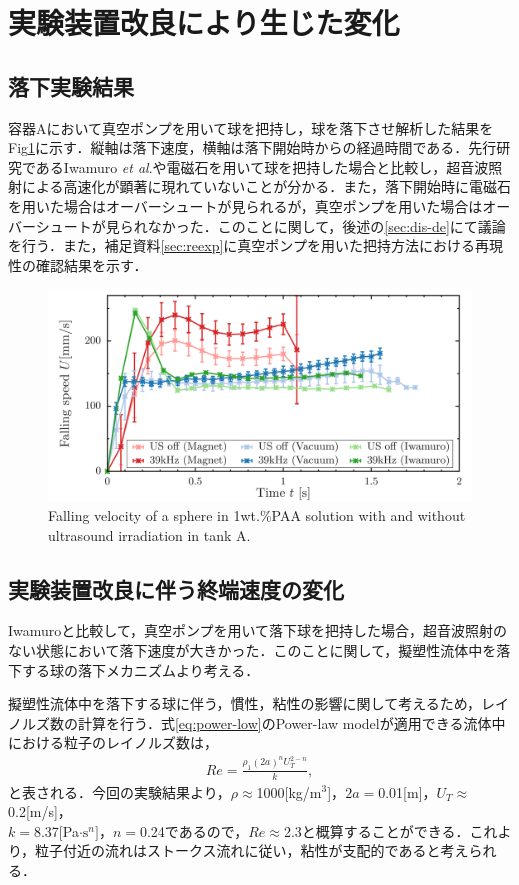 \section{実験装置改良により生じた変化}

\subsection{落下実験結果}

容器Aにおいて真空ポンプを用いて球を把持し，球を落下させ解析した結果をFig\ref{fig:falling-A}に示す．縦軸は落下速度，横軸は落下開始時からの経過時間である．先行研究であるIwamuro \textit{et al}.\cite{ref:8}や電磁石を用いて球を把持した場合と比較し，超音波照射による高速化が顕著に現れていないことが分かる．また，落下開始時に電磁石を用いた場合はオーバーシュートが見られるが，真空ポンプを用いた場合はオーバーシュートが見られなかった．このことに関して，後述の\ref{sec:dis-de}にて議論を行う．また，補足資料\ref{sec:reexp}に真空ポンプを用いた把持方法における再現性の確認結果を示す．

\begin{figure}[ht]
    \centering
    \includegraphics[width=12cm,clip]{./4-Results/s1-A.png}
    \caption{Falling velocity of a sphere in 1wt.\%PAA solution with and without ultrasound irradiation in tank A.}
    \label{fig:falling-A}
\end{figure}

\subsection{実験装置改良に伴う終端速度の変化}

Iwamuro\cite{ref:8}と比較して，真空ポンプを用いて落下球を把持した場合，超音波照射のない状態において落下速度が大きかった．このことに関して，擬塑性流体中を落下する球の落下メカニズムより考える．

擬塑性流体中を落下する球に伴う，慣性，粘性の影響に関して考えるため，レイノルズ数の計算を行う．式\ref{eq:power-low}のPower-law modelが適用できる流体中における粒子のレイノルズ数は，
\begin{eqnarray}
    Re = \frac{\rho_1 \left(2a\right)^n U_T^{2-n}}{k} ,
\end{eqnarray}
と表される\cite{ref:1,ref:8-5}．今回の実験結果より，$\rho \approx$1000[kg/m${}^3$]，$2a =$0.01[m]，$U_T \approx$0.2[m/s]，\\$k =$8.37[Pa$\cdot \text{s}^n]$，$n =$0.24であるので，$Re \approx$2.3と概算することができる．これより，粒子付近の流れはストークス流れに従い，粘性が支配的であると考えられる．

